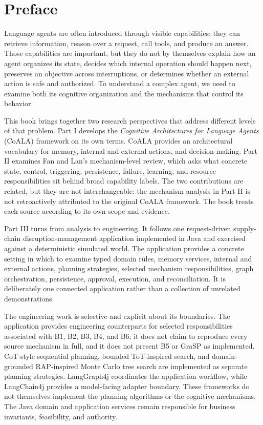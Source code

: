 \chapter*{Preface}

Language agents are often introduced through visible capabilities: they can retrieve information, reason over a request, call tools, and produce an answer. Those capabilities are important, but they do not by themselves explain how an agent organizes its state, decides which internal operation should happen next, preserves an objective across interruptions, or determines whether an external action is safe and authorized. To understand a complex agent, we need to examine both its cognitive organization and the mechanisms that control its behavior.

This book brings together two research perspectives that address different levels of that problem. Part I develops the \emph{Cognitive Architectures for Language Agents} (CoALA) framework on its own terms. CoALA provides an architectural vocabulary for memory, internal and external actions, and decision-making. Part II examines Fan and Lan's mechanism-level review, which asks what concrete state, control, triggering, persistence, failure, learning, and resource responsibilities sit behind broad capability labels. The two contributions are related, but they are not interchangeable: the mechanism analysis in Part II is not retroactively attributed to the original CoALA framework. The book treats each source according to its own scope and evidence.\cite{sumers2024coala,fanlan2026mechanisms}

Part III turns from analysis to engineering. It follows one request-driven supply-chain disruption-management application implemented in Java and exercised against a deterministic simulated world. The application provides a concrete setting in which to examine typed domain rules, memory services, internal and external actions, planning strategies, selected mechanism responsibilities, graph orchestration, persistence, approval, execution, and reconciliation. It is deliberately one connected application rather than a collection of unrelated demonstrations.

The engineering work is selective and explicit about its boundaries. The application provides engineering counterparts for selected responsibilities associated with B1, B2, B3, B4, and B6; it does not claim to reproduce every source mechanism in full, and it does not present B5 or GraSP as implemented. CoT-style sequential planning, bounded ToT-inspired search, and domain-grounded RAP-inspired Monte Carlo tree search are implemented as separate planning strategies. LangGraph4j coordinates the application workflow, while LangChain4j provides a model-facing adapter boundary. These frameworks do not themselves implement the planning algorithms or the cognitive mechanisms. The Java domain and application services remain responsible for business invariants, feasibility, and authority.

